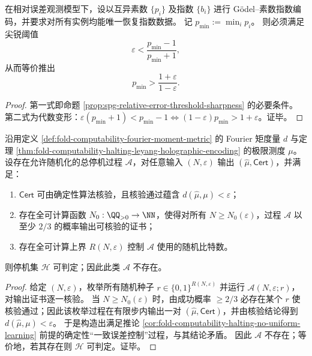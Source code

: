 \begin{corollary}\label{cor:conclusion-godel-prime-noise-threshold-pmin}
在相对误差观测模型下，设以互异素数 \(\{p_i\}\) 及指数 \(\{b_i\}\) 进行 Gödel--素数指数编码，并要求对所有实例均能唯一恢复指数数据。
记 \(p_{\min}:=\min_i p_i\)。
则必须满足尖锐阈值
\[
\varepsilon<\frac{p_{\min}-1}{p_{\min}+1},
\]
从而等价推出
\[
p_{\min}>\frac{1+\varepsilon}{1-\varepsilon}.
\]
\end{corollary}
\begin{proof}
第一式即命题 \ref{prop:spg-relative-error-threshold-sharpness} 的必要条件。
第二式为代数变形：\(\varepsilon(p_{\min}+1)<p_{\min}-1\iff (1-\varepsilon)p_{\min}>1+\varepsilon\)。证毕。
\end{proof}

\begin{theorem}[带可核验证书的随机化统一误差控制学习仍推出停机可判定]\label{thm:conclusion-certified-randomized-uniform-learning-implies-decidable-halting}
沿用定义 \ref{def:fold-computability-fourier-moment-metric} 的 Fourier 矩度量 \(d\) 与定理 \ref{thm:fold-computability-halting-leyang-holographic-encoding} 的极限测度 \(\mu\)。
设存在允许随机化的总停机过程 \(\mathcal A\)，对任意输入 \((N,\varepsilon)\) 输出 \((\widehat\mu,\mathsf{Cert})\)，并满足：
\begin{enumerate}
  \item \(\mathsf{Cert}\) 可由确定性算法核验，且核验通过蕴含 \(d(\widehat\mu,\mu)<\varepsilon\)；
  \item 存在全可计算函数 \(N_0:\QQ_{>0}\to\NN\)，使得对所有 \(N\ge N_0(\varepsilon)\)，过程 \(\mathcal A\) 以至少 \(2/3\) 的概率输出可核验的证书；
  \item 存在全可计算上界 \(R(N,\varepsilon)\) 控制 \(\mathcal A\) 使用的随机比特数。
\end{enumerate}
则停机集 \(\mathcal H\) 可判定；因此此类 \(\mathcal A\) 不存在。
\end{theorem}
\begin{proof}
给定 \((N,\varepsilon)\)，枚举所有随机种子 \(r\in\{0,1\}^{R(N,\varepsilon)}\) 并运行 \(\mathcal A(N,\varepsilon;r)\)，对输出证书逐一核验。
当 \(N\ge N_0(\varepsilon)\) 时，由成功概率 \(\ge 2/3\) 必存在某个 \(r\) 使核验通过；因此该枚举过程在有限步内输出一对 \((\widehat\mu,\mathsf{Cert})\)，并由核验结论得到 \(d(\widehat\mu,\mu)<\varepsilon\)。
于是构造出满足推论 \ref{cor:fold-computability-halting-no-uniform-learning} 前提的确定性“一致误差控制”过程，与其结论矛盾。
因此 \(\mathcal A\) 不存在；等价地，若其存在则 \(\mathcal H\) 可判定。证毕。
\end{proof}

